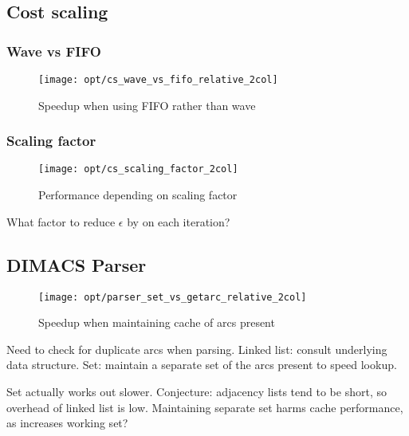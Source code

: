 \subsection{Cost scaling}

\subsubsection{Wave vs FIFO}

\begin{figure}
    \centering
    \texttt{[image: opt/cs\_wave\_vs\_fifo\_relative\_2col]}
    \caption{Speedup when using FIFO rather than wave}
    \label{fig:opt-cs-wave-vs-fifo}
\end{figure}


\subsubsection{Scaling factor}

\begin{figure}
    \centering
    \texttt{[image: opt/cs\_scaling\_factor\_2col]}
    \caption{Performance depending on scaling factor}
    \label{fig:opt-cs-scaling-factor}
\end{figure}

What factor to reduce $\epsilon$ by on each iteration?

\subsection{DIMACS Parser}

\begin{figure}
    \centering
    \texttt{[image: opt/parser\_set\_vs\_getarc\_relative\_2col]}
    \caption{Speedup when maintaining cache of arcs present}
    \label{fig:opt-dimacs-parser}
\end{figure}

Need to check for duplicate arcs when parsing. Linked list: consult underlying data structure. Set: maintain a separate set of the arcs present to speed lookup.

Set actually works out slower. Conjecture: adjacency lists tend to be short, so overhead of linked list is low. Maintaining separate set harms cache performance, as increases working set?



